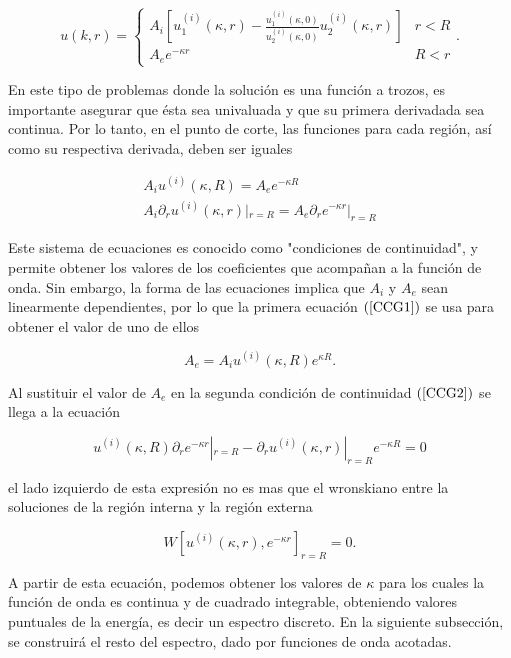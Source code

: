 \begin{equation}
\label{FOELPCA}
u(k,r) =
\begin{cases}
A_i \left[ u^{(i)}_1(\kappa,r) -  \frac{u^{(i)}_1(\kappa,0)}{u_2^{(i)}(\kappa,0)} u_2^{(i)}(\kappa,r) \right] & r < R 
\\ 
A_e e^{-\kappa r} & R < r
\end{cases}.
\end{equation} 


En este tipo de problemas donde la solución es una función a trozos, es importante asegurar que ésta sea univaluada y que su primera derivadada sea continua. Por lo tanto, en el punto de corte, las funciones para cada región, así como su respectiva derivada, deben ser iguales

\begin{eqnarray}
	\label{CCG1}
	A_i u^{(i)}(\kappa, R) = A_e e^{-\kappa R}
	\\
	\label{CCG2}
	A_i \partial_r u^{(i)}(\kappa, r)|_{r = R} = A_e \partial_r e^{-\kappa r}|_{r = R}
\end{eqnarray}

Este sistema de ecuaciones es conocido como "condiciones de continuidad", y permite obtener los valores de los coeficientes que acompañan a la función de onda. Sin embargo, la forma de las ecuaciones implica que $A_i$ y $A_e$ sean linearmente dependientes, por lo que la primera ecuación $(\ref{CCG1})$ se usa para obtener el valor de uno de ellos

\begin{equation*}
A_e = A_i u^{(i)}(\kappa, R) e^{\kappa R}.
\end{equation*}

Al sustituir el valor de $A_e$ en la segunda condición de continuidad $(\ref{CCG2})$ se llega a  la ecuación

\begin{equation*}
	 u^{(i)}(\kappa, R) \partial_r e^{-\kappa r}|_{r = R} - \partial_r u^{(i)}(\kappa, r)|_{r = R} e^{-\kappa R} = 0 
\end{equation*}

el lado izquierdo de esta expresión no es mas que el wronskiano entre la soluciones de la región interna y la región externa

\begin{equation}
W[u^{(i)}(\kappa, r), e^{-\kappa r}]_{r = R} = 0 \label{COCUG}.
\end{equation}

A partir de esta ecuación, podemos obtener los valores de $\kappa$ para los cuales la función de onda es continua y de cuadrado integrable, obteniendo valores puntuales de la energía, es decir un espectro discreto. En la siguiente subsección, se construirá el resto del espectro, dado por funciones de onda acotadas.


